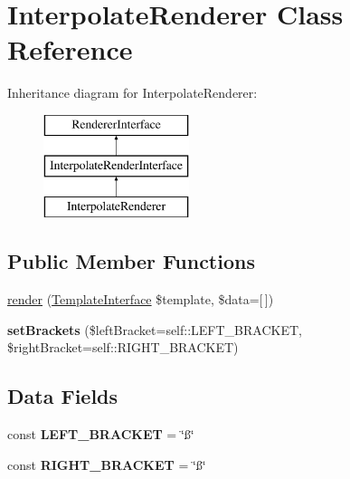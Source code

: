 \hypertarget{class_pes_1_1_view_1_1_renderer_1_1_interpolate_renderer}{}\section{Interpolate\+Renderer Class Reference}
\label{class_pes_1_1_view_1_1_renderer_1_1_interpolate_renderer}
Inheritance diagram for Interpolate\+Renderer\+:\begin{figure}[H]
\begin{center}
\leavevmode
\includegraphics[height=3.000000cm]{class_pes_1_1_view_1_1_renderer_1_1_interpolate_renderer}
\end{center}
\end{figure}
\subsection*{Public Member Functions}
\begin{DoxyCompactItemize}
\item 
\mbox{\hyperlink{class_pes_1_1_view_1_1_renderer_1_1_interpolate_renderer_ac681e2bac7726f63ea06399c1e60ed70}{render}} (\mbox{\hyperlink{interface_pes_1_1_view_1_1_template_1_1_template_interface}{Template\+Interface}} \$template, \$data=\mbox{[}$\,$\mbox{]})
\item 
\mbox{\label{class_pes_1_1_view_1_1_renderer_1_1_interpolate_renderer_a36e3eb4bb5c08dd9ac41a2270148154d}} 
{\bfseries set\+Brackets} (\$left\+Bracket=self\+::\+L\+E\+F\+T\+\_\+\+B\+R\+A\+C\+K\+ET, \$right\+Bracket=self\+::\+R\+I\+G\+H\+T\+\_\+\+B\+R\+A\+C\+K\+ET)
\end{DoxyCompactItemize}
\subsection*{Data Fields}
\begin{DoxyCompactItemize}
\item 
\mbox{\label{class_pes_1_1_view_1_1_renderer_1_1_interpolate_renderer_ab93fa3db4d6b8f28228a789986a57e52}} 
const {\bfseries L\+E\+F\+T\+\_\+\+B\+R\+A\+C\+K\+ET} = \char`\"{}ß\char`\"{}
\item 
\mbox{\label{class_pes_1_1_view_1_1_renderer_1_1_interpolate_renderer_a74fb396ccc9e013233b44e2d34711c90}} 
const {\bfseries R\+I\+G\+H\+T\+\_\+\+B\+R\+A\+C\+K\+ET} = \char`\"{}ß\char`\"{}
\end{DoxyCompactItemize}


